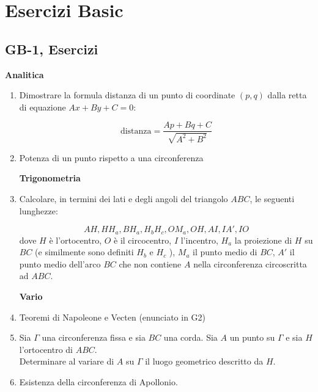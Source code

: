 
\section{Esercizi Basic}
\subsection{GB-1, Esercizi}
\textbf{Analitica}
\begin{enumerate}
\item  Dimostrare la formula distanza di un punto di coordinate $(p,q)$ dalla retta di equazione $Ax+By+C=0$:

$$\text{distanza}=\frac{Ap+Bq+C}{\sqrt{A^2+B^2}}$$

\item  Potenza di un punto rispetto a una circonferenza

\textbf{Trigonometria}

\item  Calcolare, in termini dei lati e degli angoli del triangolo $ABC$, le seguenti lunghezze: 

$$AH, HH_a , BH_a , H_bH_c , OM_a , OH, AI, IA' , IO$$
dove $H$ è l’ortocentro, $O$ è il circocentro, $I$ l’incentro, $H_a$ la proiezione di $H$ su $BC$ (e similmente
sono definiti $H_b$ e $H_c$ ), $M_a$ il punto medio di $BC$, $A'$ il punto medio dell’arco $BC$ che non contiene
$A$ nella circonferenza circoscritta ad $ABC$.

\textbf{Vario}

\item Teoremi di Napoleone e Vecten (enunciato in G2)

\item Sia $\Gamma$ una circonferenza fissa e sia $BC$ una corda. Sia $A$ un punto su $\Gamma$ e sia $H$ l'ortocentro di $ABC$.\\
Determinare al variare di $A$ su $\Gamma$ il luogo geometrico descritto da $H$.

\item Esistenza della circonferenza di Apollonio.


\end{enumerate}


